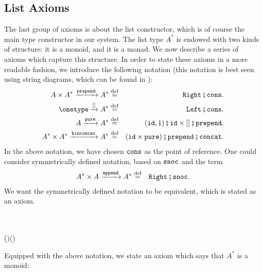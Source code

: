 \subsection{List Axioms}
\label{sec:list-axioms}
The last group of axioms is about the list  constructor, which is of course the main type constructor in our system. The list type $A^*$ is endowed with two kinds of structure: it is a monoid, and it is a monad. We now describe a series of axioms which capture this structure. In order to state these axioms in a more readable fashion, we introduce the following notation (this notation is best seen using string diagrams, which can be found in ):
\begin{eqnarray*}
        A \times A^* \xrightarrow{\prependterm} A^* & \eqdef & \rightterm\comp \consterm. \\
        \onetype \xrightarrow {[]} A^* &  \eqdef &  \leftterm\comp \consterm. \\ 
        A \xrightarrow{\pureterm} A^* & \eqdef & \appendoneterm\comp \idterm \times []\comp \prependterm. \\
    A^* \times A^* \xrightarrow{\binconcatterm} A^* & \eqdef &  (\idterm \times \pureterm)\comp \prependterm\comp \concatterm.
\end{eqnarray*}
In the above notation, we have chosen  $\mathtt{cons}$ as the point of reference. One could consider symmetrically defined notation, based on $\mathtt{snoc}$ and the term 
\begin{eqnarray*}
        A^* \times A \xrightarrow{\appendterm} A^* & \eqdef & \rightterm\comp \snocterm.
\end{eqnarray*}
We want the symmetrically defined notation to be equivalent, which is stated as an axiom.
\begin{axiom}
    \label{ax:cons-snoc-symmetry}
    \begin{casesright}
        \leftterm\comp \snocterm \equiv \leftterm\comp \consterm \\ 
        \prependoneterm\comp [] \times \idterm\comp \appendterm \equiv \appendoneterm\comp \idterm \times []\comp \prependterm \\
        (\pureterm \times \idterm)\comp \appendterm\comp \concatterm \equiv (\idterm \times \pureterm)\comp \prependterm\comp \concatterm
    \end{casesright}
\end{axiom}
Equipped with the above notation, we state an axiom which says that $A^*$ is a monoid: 
